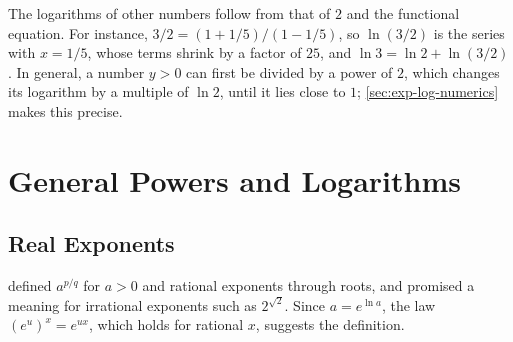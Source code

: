 \begin{table}
\end{table}

The logarithms of other numbers follow from that of $2$ and the functional equation. For instance, $3/2=(1+1/5)/(1-1/5)$, so $\ln(3/2)$ is the series with $x=1/5$, whose terms shrink by a factor of $25$, and $\ln3=\ln2+\ln(3/2)$. In general, a number $y>0$ can first be divided by a power of $2$, which changes its logarithm by a multiple of $\ln2$, until it lies close to $1$; \cref{sec:exp-log-numerics} makes this precise.

\section{General Powers and Logarithms}
\label{sec:general-powers}

\subsection{Real Exponents}

 defined $a^{p/q}$ for $a>0$ and rational exponents through roots, and promised a meaning for irrational exponents such as $2^{\sqrt2}$. Since $a=e^{\ln a}$, the law $(e^u)^x=e^{ux}$, which holds for rational $x$, suggests the definition.

